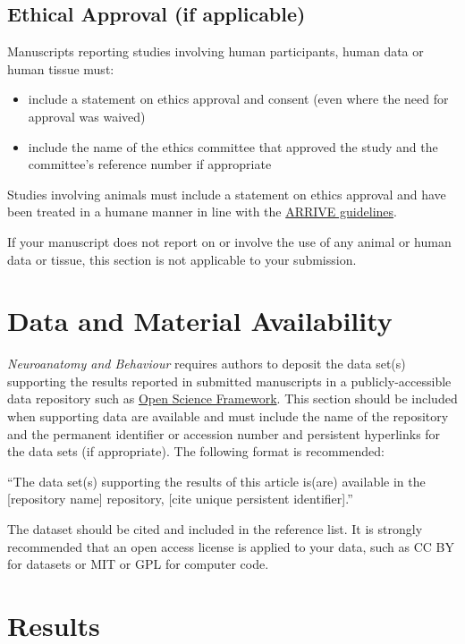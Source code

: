 \documentclass[a4paper,num-refs]{ehi-journals}
\begin{document}
\subsection{Ethical Approval (if applicable)}
Manuscripts reporting studies involving human participants, human data or human tissue must:

\begin{itemize}
\item include a statement on ethics approval and consent (even where the need for approval was waived)
\item include the name of the ethics committee that approved the study and the committee's reference number if appropriate
\end{itemize}

Studies involving animals must include a statement on ethics approval and have been treated in a humane manner in line with the \href{http://www.nc3rs.org.uk/arrive-guidelines}{ARRIVE guidelines}.

If your manuscript does not report on or involve the use of any animal or human data or tissue, this section is not applicable to your submission.

\section{Data and Material Availability}

\textit{Neuroanatomy and Behaviour} requires authors to deposit the data set(s) supporting the results reported in submitted manuscripts in a publicly-accessible data repository such as \href{https://osf.io/}{Open Science Framework}. This section should be included when supporting data are available and must include the name of the repository and the permanent identifier or accession number and persistent hyperlinks for the data sets (if appropriate). The following format is recommended:

``The data set(s) supporting the results of this article is(are) available in the [repository name] repository, [cite unique persistent identifier].''

The dataset should be cited and included in the reference list. It is strongly recommended that an open access license is applied to your data, such as CC BY for datasets or MIT or GPL for computer code.

\section{Results}
\end{document}
